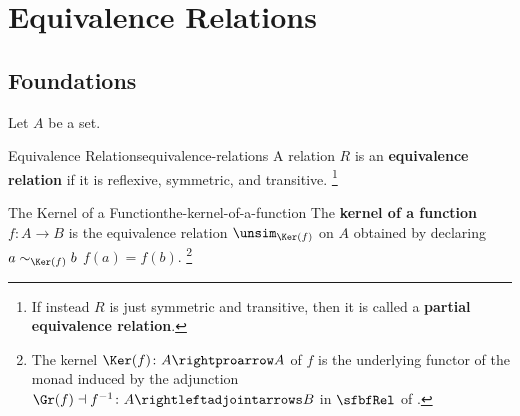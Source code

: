 \section{Equivalence Relations}\label{section-equivalence-relations}
\subsection{Foundations}\label{subsection-equivalence-relations-foundations}
Let $A$ be a set.
\begin{definition}{Equivalence Relations}{equivalence-relations}%
    A relation $R$ is an \textbf{equivalence relation} if it is reflexive, symmetric, and transitive.%
    \footnote{%
        If instead $R$ is just symmetric and transitive, then it is called a \textbf{partial equivalence relation}.
        \par\vspace*{-1.75\baselineskip}
    }%
\end{definition}
\begin{example}{The Kernel of a Function}{the-kernel-of-a-function}%
    The \textbf{kernel of a function $f\colon A\to B$} is the equivalence relation $\unsim_{\Ker(f)}$ on $A$ obtained by declaring $a\sim_{\Ker(f)}b$ \textiff $f(a)=f(b)$.%
    \footnote{%
        The kernel $\Ker(f)\colon A\rightproarrow A$ of $f$ is the underlying functor of the monad induced by the adjunction $\Gr(f)\dashv f^{-1}\colon A\rightleftadjointarrows B$ in $\sfbfRel$ of .
        \par\vspace*{-1.75\baselineskip}
    }%
\end{example}
